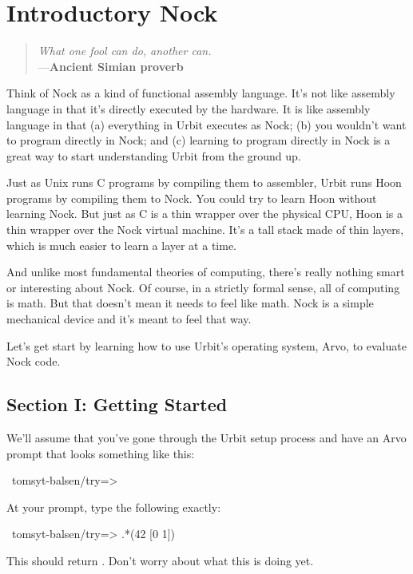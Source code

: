 \chapter{Introductory Nock}

\begin{quote}
\noindent \emph{What one fool can do, another can.}
\medskip \\
\noindent ---\textbf{Ancient Simian proverb}
\end{quote}

Think of Nock as a kind of functional assembly language.  It's not like
assembly language in that it's directly executed by the hardware.  It is like
assembly language in that (a) everything in Urbit executes as Nock; (b) you
wouldn't want to program directly in Nock; and (c) learning to program directly
in Nock is a great way to start understanding Urbit from the ground up.

Just as Unix runs C programs by compiling them to assembler, Urbit runs Hoon
programs by compiling them to Nock.  You could try to learn Hoon without
learning Nock.  But just as C is a thin wrapper over the physical CPU, Hoon is
a thin wrapper over the Nock virtual machine.  It's a tall stack made of thin
layers, which is much easier to learn a layer at a time.

And unlike most fundamental theories of computing, there's really nothing smart
or interesting about Nock.  Of course, in a strictly formal sense, all of
computing is math.  But that doesn't mean it needs to feel like math.  Nock is
a simple mechanical device and it's meant to feel that way.

Let's get start by learning how to use Urbit's operating system, Arvo, to
evaluate Nock code.

\section{Section I: Getting Started}

We'll assume that you've gone through the Urbit setup process and have an Arvo
prompt that looks something like this:

\begin{code}
~tomsyt-balsen/try=> 
\end{code}

At your prompt, type the following exactly:
\begin{code}
~tomsyt-balsen/try=> .*(42 [0 1])
\end{code}
This should return . Don't worry about what this is doing yet.

